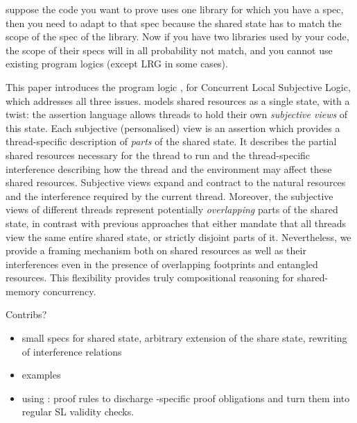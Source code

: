suppose the code you want to prove uses one library for which you have
a spec, then you need to adapt to that spec because the shared state
has to match the scope of the spec of the library.  Now if you have
two libraries used by your code, the scope of their specs will in all
probability not match, and you cannot use existing program logics
(except LRG in some cases).


This paper introduces the program logic \colosl, for Concurrent Local
Subjective Logic, which addresses all three issues. \colosl models
shared resources as a single state, with a twist: the assertion
language allows threads to hold their own \emph{subjective views} of
this state. Each subjective (personalised) view is an assertion which
provides a thread-specific description of \emph{parts} of the shared
state. It describes the partial shared resources necessary for the
thread to run and the thread-specific interference describing how the
thread and the environment may affect these shared
resources. Subjective views expand and contract to the natural
resources and the interference required by the current
thread. Moreover, the subjective views of different threads represent
potentially \emph{overlapping} parts of the shared state, in contrast
with previous approaches that either mandate that all threads view the
same entire shared state, or strictly disjoint parts of
it. Nevertheless, we provide a framing mechanism both on shared
resources as well as their interferences even in the presence of
overlapping footprints and entangled resources.  This flexibility
provides truly compositional reasoning for shared-memory concurrency.

Contribs?
\begin{itemize}
\item
  small specs for shared state,
  arbitrary extension of the share state,
  rewriting of interference relations
\item
  examples
\item
  using \colosl: proof rules to discharge \colosl-specific proof
  obligations and turn them into regular SL validity checks.
\end{itemize}


